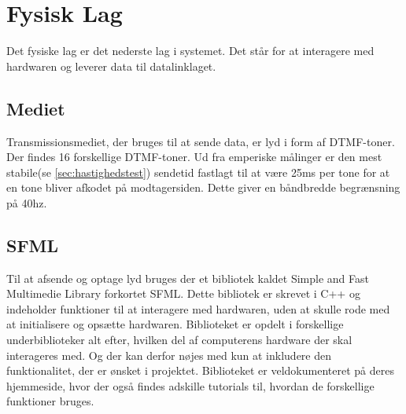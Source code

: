 \section{Fysisk Lag}
Det fysiske lag er det nederste lag i systemet. Det står for at interagere med hardwaren og leverer data til datalinklaget. 

\subsection{Mediet}
Transmissionsmediet, der bruges til at sende data, er lyd i form af DTMF-toner. Der findes 16 forskellige DTMF-toner. Ud fra emperiske målinger er den mest stabile(se \ref{sec:hastighedstest}) sendetid fastlagt til at være 25ms per tone for at en tone bliver afkodet på modtagersiden. Dette giver en båndbredde begrænsning på 40hz.

\subsection{SFML}
Til at afsende og optage lyd bruges der et bibliotek kaldet Simple and Fast Multimedie Library forkortet SFML. Dette bibliotek er skrevet i C++ og indeholder funktioner til at interagere med hardwaren, uden at skulle rode med at initialisere og opsætte hardwaren. Biblioteket er opdelt i forskellige underbiblioteker alt efter, hvilken del af computerens hardware der skal interageres med. Og der kan derfor nøjes med kun at inkludere den funktionalitet, der er ønsket i projektet. Biblioteket er veldokumenteret på deres hjemmeside, hvor der også findes adskille tutorials til, hvordan de forskellige funktioner bruges.

